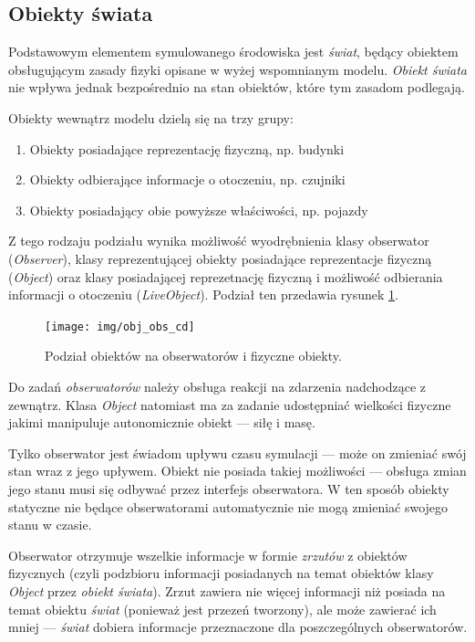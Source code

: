{{\subsection{Obiekty świata}
\par{
Podstawowym elementem symulowanego środowiska jest \textit{świat}, będący obiektem obsługującym zasady fizyki opisane w wyżej wspomnianym modelu. \textit{Obiekt świata} nie wpływa jednak bezpośrednio na stan obiektów, które tym zasadom podlegają.
}
\par{
Obiekty wewnątrz modelu dzielą się na trzy grupy:
\begin{enumerate}
\item Obiekty posiadające reprezentację fizyczną, np. budynki
\item Obiekty odbierające informacje o otoczeniu, np. czujniki
\item Obiekty posiadający obie powyższe właściwości, np. pojazdy
\end{enumerate}
Z tego rodzaju podziału wynika możliwość wyodrębnienia klasy obserwator (\textit{Observer}), klasy reprezentującej obiekty posiadające reprezentacje fizyczną (\textit{Object}) oraz klasy posiadającej reprezetnację fizyczną i możliwość odbierania informacji o otoczeniu (\textit{LiveObject}). Podział ten przedawia rysunek \ref{obj_obs_cd}.
}
\begin{figure}[htb]
    \begin{center}
	\texttt{[image: img/obj\_obs\_cd]}
	\caption{Podział obiektów na obserwatorów i fizyczne obiekty.}
	\label{obj_obs_cd}
    \end{center}
\end{figure}

\par{
Do zadań \textit{obserwatorów} należy obsługa reakcji na zdarzenia nadchodzące z zewnątrz. Klasa \textit{Object} natomiast ma za zadanie udostępniać wielkości fizyczne jakimi manipuluje autonomicznie obiekt --- siłę i masę.
}
\par{
Tylko obserwator jest świadom upływu czasu symulacji --- może on zmieniać swój stan wraz z jego upływem. Obiekt nie posiada takiej możliwości --- obsługa zmian jego stanu musi się odbywać przez interfejs obserwatora. W ten sposób obiekty statyczne nie będące obserwatorami automatycznie nie mogą zmieniać swojego stanu w czasie.
}
\par{
Obserwator otrzymuje wszelkie informacje w formie \textit{zrzutów} z obiektów fizycznych (czyli podzbioru informacji posiadanych na temat obiektów klasy \textit{Object} przez \textit{obiekt świata}). Zrzut zawiera nie więcej informacji niż posiada na temat obiektu \textit{świat} (ponieważ jest przezeń tworzony), ale może zawierać ich mniej --- \textit{świat} dobiera informacje przeznaczone dla poszczególnych obserwatorów.
}

}}
